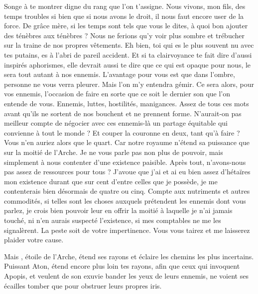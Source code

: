 \scene

\StageDirII{\reine, \vladimir}



\begin{drama}
  \reinespeaks    Songe à te montrer digne du rang que l’on t’assigne. Nous vivons, mon fils, des temps troubles si bien que si nous avons le droit, il nous faut encore user de la force.
  \vladimirspeaks De grâce mère, si les temps sont tels que vous le dites, à quoi bon ajouter des ténèbres aux ténèbres ? Nous ne ferions qu’y voir plus sombre et trébucher sur la traine de nos propres vêtements.
  \reinespeaks    Eh bien, toi qui es le plus souvent nu avec tes putains, es à l’abri de pareil accident. Et si ta clairvoyance te fait dire d’aussi inspirés aphorismes, elle devrait aussi te dire que ce qui est opaque pour nous, le sera tout autant à nos ennemis. L’avantage pour vous est que dans l’ombre, personne ne vous verra pleurer.
  \vladimirspeaks Mais l’on m’y entendra gémir.
  \reinespeaks Ce sera alors, pour vos ennemis, l’occasion de faire en sorte que ce soit le dernier son que l’on entende de vous.
  \vladimirspeaks Ennemis, luttes, hostilités, manigances. Assez de tous ces mots avant qu’ils ne sortent de nos bouchent et ne prennent forme. N’aurait-on pas meilleur compte de négocier avec ces ennemis-là un partage équitable qui convienne à tout le monde ?
  \reinespeaks Et couper la  couronne en deux, tant qu’à faire ? Vous n’en auriez alors que le quart. Car notre royaume n’étend sa puissance que sur la moitié de l’Arche.
  \vladimirspeaks Je ne vous parle pas non plus de pouvoir, mais simplement à nous contenter d’une existence paisible. Après tout, n’avons-nous pas assez de ressources pour tous ? J’avoue que j’ai et ai eu bien assez d’hétaïres mon existence durant que sur cent d’entre celles que je possède, je me contenterais bien désormais de quatre ou cinq. Compte aux nutriments et autres commodités, si telles sont les choses auxquels prétendent les ennemis dont vous parlez, je crois bien pouvoir leur en offrir la moitié à laquelle je n’ai jamais touché, ni n’en aurais suspecté l’existence, si mes comptables ne me les signalèrent.
  \reinespeaks La peste soit de votre impertinence. Vous vous tairez et me laisserez plaider votre cause.

  \choirspeaks Mais \elena, étoile de l’Arche, étend ses rayons et éclaire les chemins les plus incertains. Puissant Aton, étend encore plus loin tes rayons, afin que ceux qui invoquent Apopis, et veulent de son exuvie bander les yeux de leurs ennemis, ne voient ses écailles tomber que pour obstruer leurs propres iris.

\end{drama}



